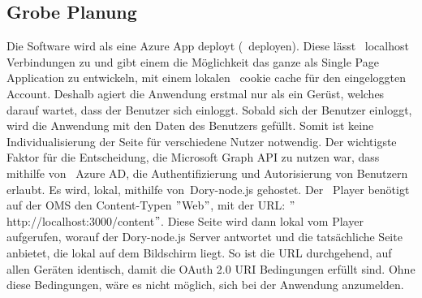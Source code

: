 \subsection{Grobe Planung}\label{subsec:grobe-planung}
Die Software wird als eine Azure App deployt (~\gls{deployen}).
Diese lässt ~\gls{localhost} Verbindungen zu und gibt einem die Möglichkeit das ganze als Single Page Application zu entwickeln, mit einem lokalen ~\gls{cookie cache} für den eingeloggten Account.
Deshalb agiert die Anwendung erstmal nur als ein Gerüst, welches darauf wartet, dass der Benutzer sich einloggt.
Sobald sich der Benutzer einloggt, wird die Anwendung mit den Daten des Benutzers gefüllt.
Somit ist keine Individualisierung der Seite für verschiedene Nutzer notwendig.
\newline
{}
Der wichtigste Faktor für die Entscheidung, die Microsoft Graph API zu nutzen war, dass mithilfe von ~\gls{Azure AD}, die Authentifizierung und Autorisierung von Benutzern erlaubt.
Es wird, lokal, mithilfe von~\gls{Dory-node.js} gehostet.
\newline
Der ~\gls{Player} benötigt auf der OMS den Content-Typen \("\)Web\("\),
\newline
mit der URL: \("\)http://localhost:3000/content\("\).
Diese Seite wird dann lokal vom Player aufgerufen, worauf der Dory-node.js Server antwortet und die tatsächliche Seite anbietet, die lokal auf dem Bildschirm liegt.
So ist die URL durchgehend, auf allen Geräten identisch, damit die OAuth 2.0 URI Bedingungen erfüllt sind.
Ohne diese Bedingungen, wäre es nicht möglich, sich bei der Anwendung anzumelden.
\newline
\newline
\newline


